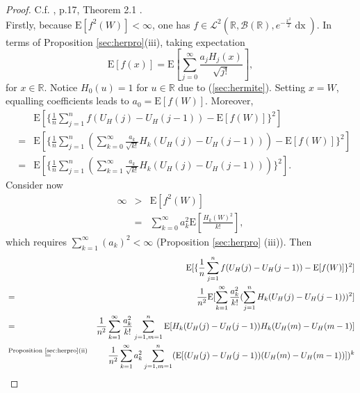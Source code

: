 \documentclass[a4paper, twoside, 11pt]{article}
\theoremstyle{definition}
\begin{document}
  \begin{proof}
	C.f. \cite{nourdin}, p.17, Theorem 2.1 .\\
	Firstly, because $\mathrm{E}[f^2(W)] < \infty$, one has $f \in \mathcal{L}^2(\mathbb{R}, \mathscr{B}(\mathbb{R}), e^{-\frac{x^2}{2}}\mathop{dx})$. In terms of Proposition \ref{sec:herpro}(iii), taking expectation
   \begin{equation*}
	  \mathrm{E}[f(x)] = \mathrm{E}[\sum\limits_{j=0}^{\infty} \frac{a_jH_j(x)}{\sqrt{j!}}], 
	\end{equation*}
	for $x \in \mathbb{R}$.
	Notice $H_0(u)=1$ for $u\in \mathbb{R}$ due to (\ref{sec:hermite}). Setting $x=W$, equalling coefficients leads to $a_0 = \mathrm{E}[f(W)]$. Moreover,
	\begin{eqnarray*}
	  && \mathrm{E}[\{\frac{1}{n}\sum\limits_{j=1}^n f(U_H(j) - U_H(j-1)) - \mathrm{E}[f(W)]\}^2]\\
	  &=& \mathrm{E}[\{\frac{1}{n}\sum\limits_{j=1}^n (\sum\limits_{k=0}^\infty \frac{a_k}{\sqrt{k!}} H_k(U_H(j) - U_H(j-1))) - \mathrm{E}[f(W)]\}^2] \\
	  &=& \mathrm{E}[\{\frac{1}{n}\sum\limits_{j=1}^n (\sum\limits_{k=1}^\infty \frac{a_k}{\sqrt{k!}} H_k(U_H(j) - U_H(j-1)))\}^2].
	\end{eqnarray*}
	Consider now 
	\begin{eqnarray*}
	  \infty &>& \mathrm{E}[f^2(W)]\\ 
	  &=& \sum_{k = 0} ^ \infty a_k^2 \mathrm{E}[\frac{H_k(W)^2}{k!}],
	\end{eqnarray*}
	which requires $\sum\limits_{k=1}^\infty (a_k)^2 < \infty$ (Proposition \ref{sec:herpro} (iii)). Then
	\begin{eqnarray*}
	  && \mathrm{E}[\{\frac{1}{n}\sum\limits_{j=1}^n f(U_H(j) - U_H(j-1)) - \mathrm{E}[f(W)]\}^2]\\
	  &=& \frac{1}{n^2} \mathrm{E}[\sum\limits_{k=1}^\infty \frac{a_k^2}{k!}(\sum\limits_{j=1}^n H_k(U_H(j) - U_H(j-1)))^2] \\
	  &=& \frac{1}{n^2} \sum\limits_{k=1}^\infty \frac{a_k^2}{k!}\sum\limits_{j=1, m=1}^n \mathrm{E}[H_k(U_H(j) - U_H(j-1))  H_k(U_H(m) - U_H(m-1)]\\
	  &\overset{\text{Proposition \ref{sec:herpro}(ii)}}{=}&  \frac{1}{n^2} \sum\limits_{k=1}^\infty a_k^2\sum\limits_{j=1, m=1}^n (\mathrm{E}[(U_H(j) - U_H(j-1)) (U_H(m) - U_H(m-1))])^k \\

\end{eqnarray*}
\end{proof}
\end{document}
